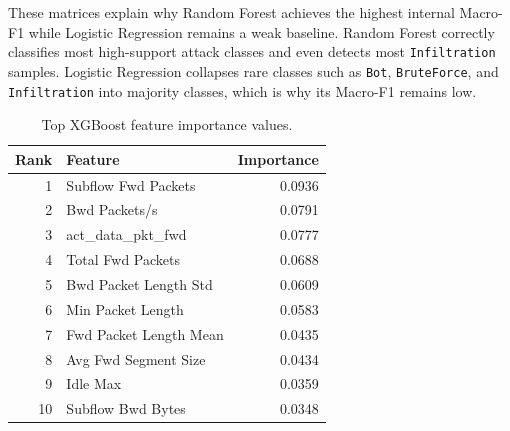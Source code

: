 \documentclass[12pt,a4paper]{article}
\begin{document}
\begin{table}[H]
\centering
\caption{Logistic Regression confusion matrix without imbalance handling.}
\scriptsize
\setlength{\tabcolsep}{2pt}
\end{table}

These matrices explain why Random Forest achieves the highest internal Macro-F1 while Logistic Regression remains a weak baseline. Random Forest correctly classifies most high-support attack classes and even detects most \texttt{Infiltration} samples. Logistic Regression collapses rare classes such as \texttt{Bot}, \texttt{BruteForce}, and \texttt{Infiltration} into majority classes, which is why its Macro-F1 remains low.

\begin{longtable}{r l r}
\caption{Top XGBoost feature importance values.}\\
\toprule
\textbf{Rank} & \textbf{Feature} & \textbf{Importance} \\
\midrule
1 & Subflow Fwd Packets & 0.0936 \\
2 & Bwd Packets/s & 0.0791 \\
3 & act\_data\_pkt\_fwd & 0.0777 \\
4 & Total Fwd Packets & 0.0688 \\
5 & Bwd Packet Length Std & 0.0609 \\
6 & Min Packet Length & 0.0583 \\
7 & Fwd Packet Length Mean & 0.0435 \\
8 & Avg Fwd Segment Size & 0.0434 \\
9 & Idle Max & 0.0359 \\
10 & Subflow Bwd Bytes & 0.0348 \\
\bottomrule
\end{longtable}
\end{document}
